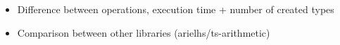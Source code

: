 \begin{itemize}
  \item Difference between operations, execution time + number of created types 
  \item Comparison between other libraries (arielhs/ts-arithmetic)
\end{itemize}

